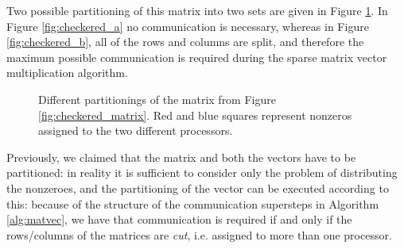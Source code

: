 Two possible partitioning of this matrix into two sets are given in Figure \ref{fig:checkered_partitions}. In Figure \ref{fig:checkered_a} no communication is necessary, whereas in Figure \ref{fig:checkered_b}, all of the rows and columns are split, and therefore the maximum possible communication is required during the sparse matrix vector multiplication algorithm.

\begin{figure}[h]
	\centering
	\hspace{1cm}
	\caption{Different partitionings of the matrix from Figure \ref{fig:checkered_matrix}. Red and blue squares represent nonzeros assigned to the two different processors.} \label{fig:checkered_partitions}
\end{figure}

Previously, we claimed that the matrix and both the vectors have to be partitioned: in reality it is sufficient to consider only the problem of distributing the nonzeroes, and the partitioning of the vector can be executed according to this: because of the structure of the communication supersteps in Algorithm \ref{alg:matvec}, we have that communication is required if and only if the rows/columns of the matrices are \emph{cut}, i.e. assigned to more than one processor.

